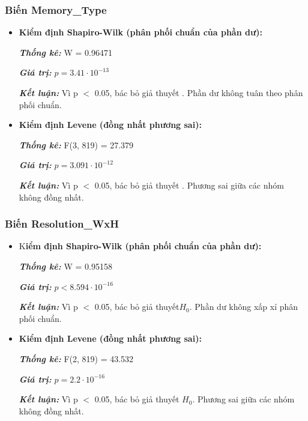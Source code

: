 \subsubsection{Biến Memory\_Type}
\begin{itemize}
    \item \textbf{Kiểm định Shapiro-Wilk (phân phối chuẩn của phần dư):}
    
    \textbf{\textit{Thống kê:}} W = 0.96471

    \textbf{\textit{Giá trị:}} $p=3.41\cdot{10}^{-13}$
    
    \textbf{\textit{Kết luận:}} Vì p $<$ 0.05, bác bỏ giả thuyết . Phần dư không tuân theo phân phối chuẩn.
    \item \textbf{Kiểm định Levene (đồng nhất phương sai):}
    
    \textbf{\textit{Thống kê:}} F(3, 819) = 27.379
    
   \textbf{\textit{Giá trị:}} $p=3.091\cdot{10}^{-12}$
    
    \textbf{\textit{Kết luận:}} Vì p $<$ 0.05, bác bỏ giả thuyết . Phương sai giữa các nhóm không đồng nhất.
\end{itemize}

\subsubsection{Biến Resolution\_WxH}

    \begin{itemize}
        \item K\textbf{iểm định Shapiro-Wilk (phân phối chuẩn của phần dư):}
        
        \textbf{\textit{Thống kê:}} W = 0.95158
        
        \textbf{\textit{Giá trị:}} $p<8.594\cdot{10}^{-16}$
        
        \textbf{\textit{Kết luận:}} Vì p $<$ 0.05, bác bỏ giả thuyết$ H_0$. Phần dư không xấp xỉ phân phối chuẩn.
        \item \textbf{Kiểm định Levene (đồng nhất phương sai):}
        
        \textbf{\textit{Thống kê:}} F(2, 819) = 43.532
        
        \textbf{\textit{Giá trị:}} $p=2.2\cdot{10}^{-16}$
        
        \textbf{\textit{Kết luận:}} Vì p $<$ 0.05, bác bỏ giả thuyết $H_0$. Phương sai giữa các nhóm không đồng nhất.
    \end{itemize}


